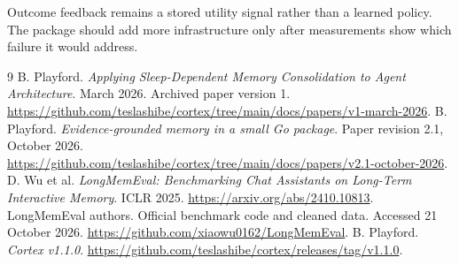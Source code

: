 \documentclass[11pt]{article}
\begin{document}
Outcome feedback remains a stored utility signal rather than a learned policy. The package should add more infrastructure only after measurements show which failure it would address.

\begin{thebibliography}{9}
 B. Playford. \emph{Applying Sleep-Dependent Memory Consolidation to Agent Architecture}. March 2026. Archived paper version 1. \url{https://github.com/teslashibe/cortex/tree/main/docs/papers/v1-march-2026}.
 B. Playford. \emph{Evidence-grounded memory in a small Go package}. Paper revision 2.1, October 2026. \url{https://github.com/teslashibe/cortex/tree/main/docs/papers/v2.1-october-2026}.
 D. Wu et al. \emph{LongMemEval: Benchmarking Chat Assistants on Long-Term Interactive Memory}. ICLR 2025. \url{https://arxiv.org/abs/2410.10813}.
 LongMemEval authors. Official benchmark code and cleaned data. Accessed 21 October 2026. \url{https://github.com/xiaowu0162/LongMemEval}.
 B. Playford. \emph{Cortex v1.1.0}. \url{https://github.com/teslashibe/cortex/releases/tag/v1.1.0}.
\end{thebibliography}
\end{document}
